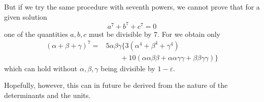 But if we try the same procedure with seventh powers, we cannot prove that for a given solution
%
\[
a^7+b^7+c^7=0
\]
one of the quantities $a,b,c$ must be divisible by $7$. For we obtain only
\[
\begin{aligned}
(\alpha+\beta+\gamma)^7={}&5\alpha\beta\gamma\{3(\alpha^4+\beta^4+\gamma^4)\\
&\qquad+10(\alpha\alpha\beta\beta+\alpha\alpha\gamma\gamma+\beta\beta\gamma\gamma)\}
\end{aligned}
\]
which can hold without $\alpha,\beta,\gamma$ being divisible by $1-\varepsilon$.

Hopefully, however, this can in future be derived from the nature of the determinants and the units.
